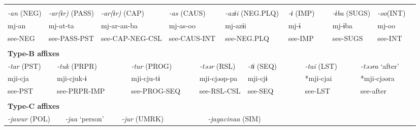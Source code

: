 \tabletail{}
\tablelasttail{}
\begin{tabularx}{\textwidth}{XXXXXXXXXXXXXXXXXXXXXX}
\lsptoprule
\multicolumn{22}{X}{{\bfseries Type-A affixes}}\\
\multicolumn{2}{X}{{ \textit{{}-an} (NEG)}} & \multicolumn{4}{X}{{ \textit{{}-ar(ɨr)} (PASS)}} & \multicolumn{3}{X}{{ \textit{{}-ar(ɨr)} (CAP)}} & \multicolumn{4}{X}{{ \textit{{}-as} (CAUS)}} & \multicolumn{3}{X}{{ \textit{{}-azɨi} (NEG.PLQ)}} & \multicolumn{2}{X}{{ \textit{{}-ɨ} (IMP)}} & \multicolumn{2}{X}{{ \textit{{}-ɨba} (SUGS)}} & { \textit{{}-oo}(INT)} & \\
\multicolumn{2}{X}{{ mj-an}} & \multicolumn{4}{X}{{ mj-at-ta}} & \multicolumn{3}{X}{{ mj-ar-an-ba}} & \multicolumn{4}{X}{{ mj-as-oo}} & \multicolumn{3}{X}{{ mj-azɨi}} & \multicolumn{2}{X}{{ mj-ɨ}} & \multicolumn{2}{X}{{ mj-ɨba}} & { mj-oo} & \\
\multicolumn{2}{X}{see-NEG} & \multicolumn{4}{X}{see-PASS-PST} & \multicolumn{3}{X}{see-CAP-NEG-CSL} & \multicolumn{4}{X}{see-CAUS-INT} & \multicolumn{3}{X}{see-NEG.PLQ} & \multicolumn{2}{X}{see-IMP} & \multicolumn{2}{X}{see-SUGS} & see-INT & \\
\multicolumn{22}{X}{}\\
\multicolumn{22}{X}{{\bfseries Type-B affixes}}\\
\multicolumn{3}{X}{{ \textit{{}-tar} (PST)}} & \multicolumn{5}{X}{{ \textit{{}-tuk} (PRPR)}} & \multicolumn{2}{X}{{ \textit{{}-tur} (PROG)}} & \multicolumn{4}{X}{{ \textit{{}-təər} (RSL)}} & \multicolumn{3}{X}{{ \textit{{}-tɨ} (SEQ)}} & \multicolumn{2}{X}{{ \textit{{}-tai} (LST)}} & \multicolumn{3}{X}{{ \textit{{}-təəra} ‘after’}}\\
\multicolumn{3}{X}{{ mji-cja}} & \multicolumn{5}{X}{{ mji-cjuk-ɨ}} & \multicolumn{2}{X}{{ mji-cju-tɨ}} & \multicolumn{4}{X}{{ mji-cjəəp-pa}} & \multicolumn{3}{X}{{ mji-cjɨ}} & \multicolumn{2}{X}{{ *mji-cjai}} & \multicolumn{3}{X}{{ *mji-cjəəra}}\\
\multicolumn{3}{X}{see-PST} & \multicolumn{5}{X}{see-PRPR-IMP} & \multicolumn{2}{X}{see-PROG-SEQ} & \multicolumn{4}{X}{see-RSL-CSL} & \multicolumn{3}{X}{see-SEQ} & \multicolumn{2}{X}{see-LST} & \multicolumn{3}{X}{{ see-after}}\\
\multicolumn{3}{X}{} & \multicolumn{5}{X}{} & \multicolumn{2}{X}{} & \multicolumn{4}{X}{} & \multicolumn{3}{X}{} & \multicolumn{2}{X}{} & \multicolumn{3}{X}{}\\
\multicolumn{22}{X}{{\bfseries Type-C affixes}}\\
\multicolumn{4}{X}{{ \textit{{}-jawur} (POL)}} & \multicolumn{3}{X}{{ \textit{{}-jaa} ‘person’}} & \multicolumn{4}{X}{{ \textit{{}-jur} (UMRK)}} & \multicolumn{4}{X}{{ \textit{{}-jagacinaa} (SIM)}} & \multicolumn{7}{X}{}\\

\end{tabularx}
